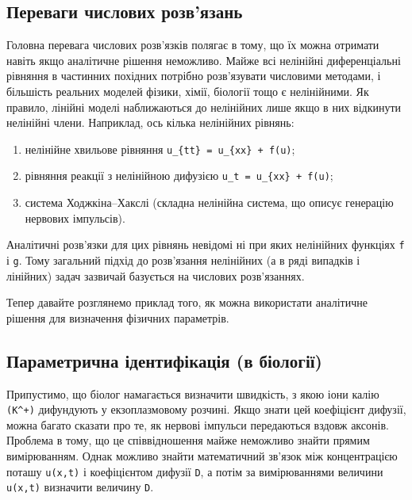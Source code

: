 \documentclass[
  ukrainian,
]{article}
\providecommand{\tightlist}{%
  \setlength{\itemsep}{0pt}\setlength{\parskip}{0pt}}
\begin{document}
\subsection{Переваги числових
розв'язань}\label{ux43fux435ux440ux435ux432ux430ux433ux438-ux447ux438ux441ux43bux43eux432ux438ux445-ux440ux43eux437ux432ux44fux437ux430ux43dux44c}

Головна перевага числових розв'язків полягає в тому, що їх можна
отримати навіть якщо аналітичне рішення неможливо. Майже всі нелінійні
диференціальні рівняння в частинних похідних потрібно розв'язувати
числовими методами, і більшість реальних моделей фізики, хімії, біології
тощо є нелінійними. Як правило, лінійні моделі наближаються до
нелінійних лише якщо в них відкинути нелінійні члени. Наприклад, ось
кілька нелінійних рівнянь:

\begin{enumerate}
\def\labelenumi{\arabic{enumi}.}
\tightlist
\item
  нелінійне хвильове рівняння \texttt{u\_\{tt\}\ =\ u\_\{xx\}\ +\ f(u)};
\item
  рівняння реакції з нелінійною дифузією
  \texttt{u\_t\ =\ u\_\{xx\}\ +\ f(u)};
\item
  система Ходжкіна--Хакслі (складна нелінійна система, що описує
  генерацію нервових імпульсів).
\end{enumerate}

Аналітичні розв'язки для цих рівнянь невідомі ні при яких нелінійних
функціях \texttt{f} і \texttt{g}. Тому загальний підхід до розв'язання
нелінійних (а в ряді випадків і лінійних) задач зазвичай базується на
числових розв'язаннях.

Тепер давайте розглянемо приклад того, як можна використати аналітичне
рішення для визначення фізичних параметрів.

\subsection{Параметрична ідентифікація (в
біології)}\label{ux43fux430ux440ux430ux43cux435ux442ux440ux438ux447ux43dux430-ux456ux434ux435ux43dux442ux438ux444ux456ux43aux430ux446ux456ux44f-ux432-ux431ux456ux43eux43bux43eux433ux456ux457}

Припустимо, що біолог намагається визначити швидкість, з якою іони калію
\texttt{(K\^{}+)} дифундують у екзоплазмовому розчині. Якщо знати цей
коефіцієнт дифузії, можна багато сказати про те, як нервові імпульси
передаються вздовж аксонів. Проблема в тому, що це співвідношення майже
неможливо знайти прямим вимірюванням. Однак можливо знайти математичний
зв'язок між концентрацією поташу \texttt{u(x,t)} і коефіцієнтом дифузії
\texttt{D}, а потім за вимірюваннями величини \texttt{u(x,t)} визначити
величину \texttt{D}.
\end{document}
